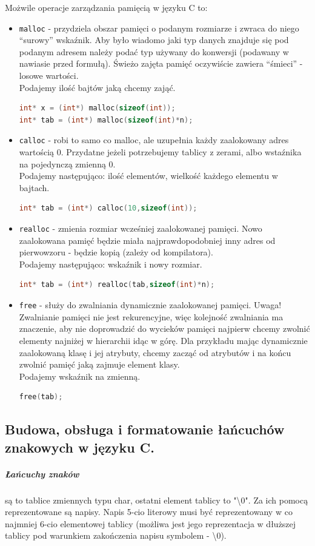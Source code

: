 \documentclass[a4paper,12pt,oneside]{book}
\begin{document}
				Możwile operacje zarządzania pamięcią w języku C to:
				\begin{itemize}
					\item \verb*|malloc| - przydziela obszar pamięci o podanym rozmiarze i zwraca do niego “surowy” wskaźnik. Aby było wiadomo jaki typ danych znajduje się pod podanym adresem należy podać typ używany do konwersji (podawany w nawiasie przed formułą). Świeżo zajęta pamięć oczywiście zawiera “śmieci” - losowe wartości. \\Podajemy ilość bajtów jaką chcemy zająć.
					\begin{lstlisting}[language=C]
int* x = (int*) malloc(sizeof(int)); 
int* tab = (int*) malloc(sizeof(int)*n);
					\end{lstlisting}
					\item \verb*|calloc| - robi to samo co malloc, ale uzupełnia każdy zaalokowany adres wartością 0. Przydatne jeżeli potrzebujemy tablicy z zerami, albo wstaźnika na pojedynczą zmienną 0. \\Podajemy następująco: ilość elementów, wielkość każdego elementu w bajtach.
					\begin{lstlisting}[language=C]
int* tab = (int*) calloc(10,sizeof(int));
					\end{lstlisting}
					\item \verb*|realloc| - zmienia rozmiar wcześniej zaalokowanej pamięci. Nowo zaalokowana pamięć będzie miała najprawdopodobniej inny adres od pierwowzoru - będzie kopią (zależy od kompilatora).\\Podajemy następująco: wskaźnik i nowy rozmiar.
					\begin{lstlisting}[language=C]
int* tab = (int*) realloc(tab,sizeof(int)*n); 
					\end{lstlisting}
					\item \verb*|free| - służy do zwalniania dynamicznie zaalokowanej pamięci. Uwaga! Zwalnianie pamięci nie jest rekurencyjne, więc kolejność zwalniania ma znaczenie, aby nie doprowadzić do wycieków pamięci najpierw chcemy zwolnić elementy najniżej w hierarchii idąc w górę. Dla przykładu mając dynamicznie zaalokowaną klasę i jej atrybuty, chcemy zacząć od atrybutów i na końcu zwolnić pamięć jaką zajmuje element klasy.\\Podajemy wskaźnik na zmienną.
					\begin{lstlisting}[language=C]
free(tab);
					\end{lstlisting}
				\end{itemize}
			\newpage\subsection{Budowa, obsługa i formatowanie łańcuchów znakowych w języku C.}
				\subparagraph{Łańcuchy znaków}są to tablice zmiennych typu char, ostatni element tablicy to "\textbackslash0". Za ich pomocą reprezentowane są napisy. Napis 5-cio literowy musi być reprezentowany w co najmniej 6-cio elementowej tablicy (możliwa jest jego reprezentacja w dłuższej tablicy pod warunkiem zakończenia napisu symbolem - \textbackslash0).\\
					
\end{document}

